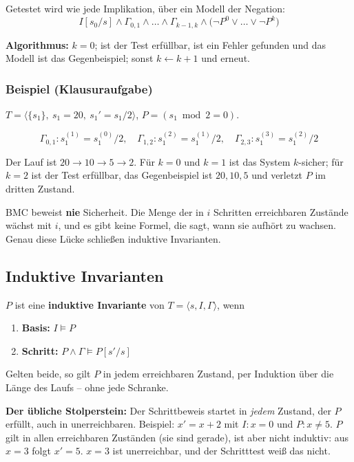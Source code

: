 \documentclass[12pt, a4paper]{article}
\begin{document}
Getestet wird wie jede Implikation, über ein Modell der Negation:
\[
I[s_0/s] \wedge \Gamma_{0,1} \wedge \dots \wedge \Gamma_{k-1,k}
\wedge \bigl(\neg P^0 \vee \dots \vee \neg P^k\bigr)
\]

\textbf{Algorithmus:} $k = 0$; ist der Test erfüllbar, ist ein Fehler gefunden und das
Modell ist das Gegenbeispiel; sonst $k \leftarrow k+1$ und erneut.

\subsubsection*{Beispiel (Klausuraufgabe)}

$T = \langle \{s_1\},\ s_1 = 20,\ s_1' = s_1 / 2 \rangle$, $P = (s_1 \bmod 2 = 0)$.

\[
\Gamma_{0,1}: s_1^{(1)} = s_1^{(0)}/2, \quad
\Gamma_{1,2}: s_1^{(2)} = s_1^{(1)}/2, \quad
\Gamma_{2,3}: s_1^{(3)} = s_1^{(2)}/2
\]

Der Lauf ist $20 \to 10 \to 5 \to 2$. Für $k=0$ und $k=1$ ist das System $k$-sicher;
für $k=2$ ist der Test erfüllbar, das Gegenbeispiel ist $20, 10, 5$ und verletzt $P$
im dritten Zustand.

\begin{notebox}
BMC beweist \textbf{nie} Sicherheit. Die Menge der in $i$ Schritten erreichbaren
Zustände wächst mit $i$, und es gibt keine Formel, die sagt, wann sie aufhört zu
wachsen. Genau diese Lücke schließen induktive Invarianten.
\end{notebox}

\subsection{Induktive Invarianten}

\begin{definitionbox}
$P$ ist eine \textbf{induktive Invariante} von $T = \langle s, I, \Gamma\rangle$, wenn
\begin{enumerate}
  \item \textbf{Basis:} $I \models P$
  \item \textbf{Schritt:} $P \wedge \Gamma \models P[s'/s]$
\end{enumerate}
\end{definitionbox}

Gelten beide, so gilt $P$ in jedem erreichbaren Zustand, per Induktion über die
Länge des Laufs -- ohne jede Schranke.

\textbf{Der übliche Stolperstein:} Der Schrittbeweis startet in \emph{jedem} Zustand,
der $P$ erfüllt, auch in unerreichbaren. Beispiel: $x' = x + 2$ mit $I: x = 0$ und
$P: x \neq 5$. $P$ gilt in allen erreichbaren Zuständen (sie sind gerade), ist aber
nicht induktiv: aus $x = 3$ folgt $x' = 5$. $x = 3$ ist unerreichbar, und der
Schritttest weiß das nicht.
\end{document}
